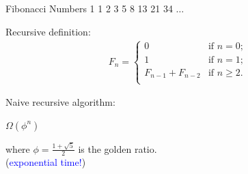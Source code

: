 \documentclass{beamer}
\begin{document}
\begin{frame}{Fibonacci Numbers}
     \hspace{2mm} 1 \hspace{2mm} 1 \hspace{2mm} 2 \hspace{2mm} 3 \hspace{2mm} 5 \hspace{2mm} 8 \hspace{2mm} 13 \hspace{2mm} 21 \hspace{2mm} 34 \hspace{2mm} $\ldots$
    \begin{alertblock}{Recursive definition:}
        \begin{align*}
            F_n =
                \begin{cases}
                    0 & \text{if $n = 0$;} \\
                    1 & \text{if $n = 1$;} \\
                    F_{n - 1} + F_{n - 2} & \text{if $n \geq 2$.}\\
                \end{cases}
        \end{align*}
    \end{alertblock}
    \begin{alertblock}{Naive recursive algorithm:}
        \begin{center}
            \LARGE
            $\Omega(\phi^n)$
        \end{center}
    \end{alertblock}
    where $\phi = \frac{1 + \sqrt{5}}{2}$ is the golden ratio. \pause
    \\ ({\Large \textcolor{blue}{exponential time!}})
\end{frame}
\end{document}
